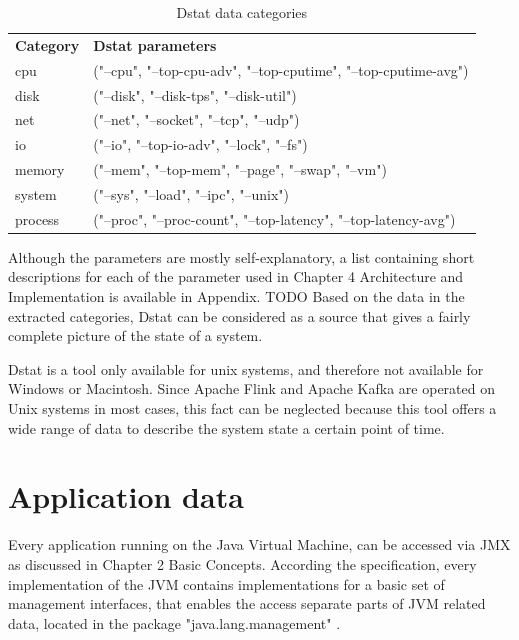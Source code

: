 \begin{table}[H]
    \begin{tabular}{ll}
        \textbf{Category} & \textbf{Dstat parameters} \\
        cpu & ("--cpu", "--top-cpu-adv", "--top-cputime", "--top-cputime-avg")\\
        disk & ("--disk", "--disk-tps", "--disk-util")\\
        net & ("--net", "--socket", "--tcp", "--udp")\\
        io & ("--io", "--top-io-adv", "--lock", "--fs")\\
        memory & ("--mem", "--top-mem", "--page", "--swap", "--vm")\\
        system & ("--sys", "--load", "--ipc", "--unix")\\
        process & ("--proc", "--proc-count", "--top-latency", "--top-latency-avg")\\
    \end{tabular}
    \caption{Dstat data categories}
    \label{tbl:dstatcategories}
\end{table}

Although the parameters are mostly self-explanatory, a list containing short descriptions
for each of the parameter used in Chapter 4 Architecture and Implementation is available in
Appendix. TODO Based on the data in the extracted categories, Dstat can be considered
as a source that gives a fairly complete picture of the state of a system.

Dstat is a tool only available for unix systems, and therefore not available for Windows or
Macintosh. Since Apache Flink and Apache Kafka are operated on Unix systems in most
cases, this fact can be neglected because this tool offers a wide range of data to describe
the system state a certain point of time.

\section{Application data}

Every application running on the Java Virtual Machine, can be accessed via JMX as discussed
in Chapter 2 Basic Concepts. According the specification, every implementation of the JVM contains
implementations for a basic set of management interfaces, that enables the access separate parts of JVM related data,
located in the package "java.lang.management" \cite{Javadoc16}.

